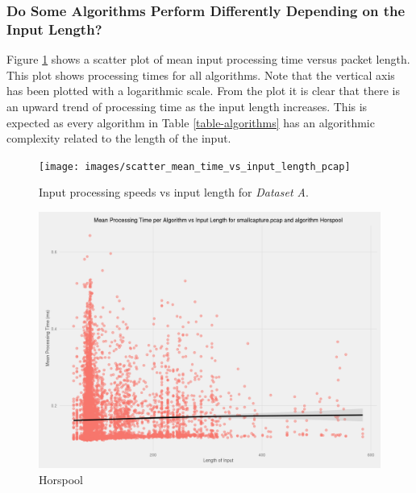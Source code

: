 \documentclass[9pt, conference]{IEEEtran}
\begin{document}
\subsubsection{Do Some Algorithms Perform Differently Depending on the Input Length?}

Figure \ref{figure-speedvslength} shows a scatter plot of mean input processing time versus packet length. This plot shows processing times for all algorithms. Note that the vertical axis has been plotted with a logarithmic scale. From the plot it is clear that there is an upward trend of processing time as the input length increases. This is expected as every algorithm in Table \ref{table-algorithms} has an algorithmic complexity related to the length of the input.

\begin{figure}[!htb]
    \centering
    \texttt{[image: images/scatter\_mean\_time\_vs\_input\_length\_pcap]}
    \caption{Input processing speeds vs input length for \textit{Dataset A}.}
    \label{figure-speedvslength}
\end{figure}

\begin{figure}[!hbt]
  \centering
  \includegraphics[width=\columnwidth]{images/scatter_mean_vs_input_length_Horspool}
  \caption{Horspool}
\end{figure}
\end{document}
